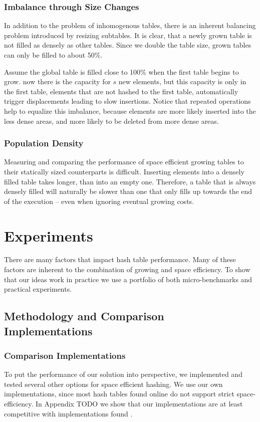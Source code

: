 \documentclass[a4paper,UKenglish]{lipics-v2016}
\begin{document}
\subsubsection*{Imbalance through Size Changes}
In addition to the problem of inhomogenous tables, there is an
inherent balancing problem introduced by resizing subtables. It is
clear, that a newly grown table is not filled as densely as other
tables.  Since we double the table size, grown tables can only be
filled to about 50\%.

Assume the global table is filled close to 100\% when the first table
begins to grow.  now there is the capacity for $s$ new elements, but
this capacity is only in the first table, elements that are not hashed
to the first table, automatically trigger displacements leading to
slow insertions.  Notice that repeated operations help to equalize
this imbalance, because elements are more likely inserted into the
less dense areas, and more likely to be deleted from more dense areas.

\subsubsection*{Population Density}
Measuring and comparing the performance of space efficient growing
tables to their statically sized counterparts is difficult.  Inserting
elements into a densely filled table takes longer, than into an empty
one.  Therefore, a table that is always densely filled will naturally
be slower than one that only fills up towards the end of the
execution -- even when ignoring eventual growing costs.

\section{Experiments}
\label{sec:exp}
There are many factors that impact hash table performance.  Many of
these factors are inherent to the combination of growing and space
efficiency.  To show that our ideas work in practice we use a
portfolio of both micro-benchmarks and practical experiments.

\subsection{Methodology and Comparison Implementations}

\subsubsection*{Comparison Implementations}
\label{sec:exp_competitor}
To put the performance of our solution into perspective, we
implemented and tested several other options for space efficient
hashing.  We use our own implementations, since most hash tables found
online do not support strict space-efficiency.  In Appendix TODO we
show that our implementations are at least competitive with
implementations found .
\end{document}

